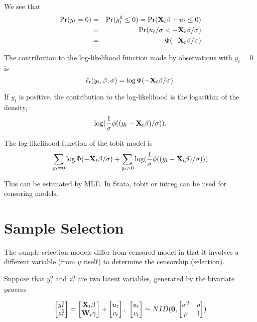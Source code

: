 We see that
\begin{eqnarray}
\mbox{Pr}(y_t= 0) & = & \mbox{Pr} (y_t^0 \leq 0) = \mbox{Pr} ({\bf
X}_t \beta +u_t \leq 0) \nonumber \\
& = & \mbox{Pr} (u_t/\sigma < - {{\bf X}_t \beta} / \sigma)
\nonumber \\
 & = &  \Phi (-{{\bf X}_t \beta} / \sigma)
\end{eqnarray}

The contribution to the log-likelihood function made by
observations with $y_t=0$ is
\begin{equation}
\ell_t(y_t, \beta, \sigma) = \log \Phi (-{\bf X}_t \beta/\sigma).
\end{equation}

If $y_t$ is positive, the contribution to the log-likelihood is the
logarithm of the density,
\begin{equation}
\log(\frac{1}{\sigma} \phi ((y_t - {\bf X}_t \beta) / \sigma )).
\end{equation}

The log-likelihood function of the tobit model is
\begin{equation}
\sum_{y_t=0} \log \Phi (-{\bf X}_t \beta/\sigma) + \sum_{y_t>0}
\log(\frac{1}{\sigma} \phi ((y_t - {\bf X}_t \beta)/\sigma )))
\end{equation}

This can be estimated by MLE. In Stata, tobit or intreg can be used
for censoring models.

\section{Sample Selection}

The sample selection models differ from censored model in that it
involves a different variable (from $y$ itself) to determine the
censorship (selection).

Suppose that $y_t^0$ and $z_t^0$ are two latent variables,
generated by the bivariate process

\begin{equation}
\begin{bmatrix}
y_t^0 \\ z_t^0
\end{bmatrix}
=\begin{bmatrix} {\bf X}_t \beta \\ {\bf W}_t \gamma
\end{bmatrix}+
\begin{bmatrix} u_t \\ v_t
\end{bmatrix}, \
\begin{bmatrix} u_t \\ v_t
\end{bmatrix} \sim NID({\bf 0},
\begin{bmatrix} \sigma^2 & \rho  \\ \rho  & 1
\end{bmatrix})
\end{equation}

